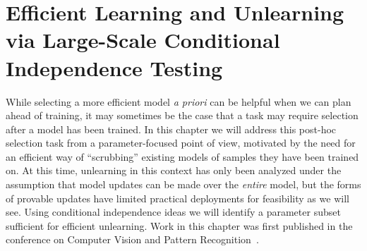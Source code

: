 \chapter{Efficient Learning and Unlearning via Large-Scale Conditional Independence Testing} \label{chap:lcodec} 

While selecting a more efficient model \textit{a priori}
can be helpful when we can plan ahead of training,
it may sometimes be the case
that a task may require selection
after a model has been trained.
In this chapter we will 
address this post-hoc selection task
from a parameter-focused point of view,
motivated by the need for an efficient way of 
``scrubbing'' existing models of samples
they have been trained on.
At this time, unlearning in this context has
only been analyzed under the assumption
that model updates can be made over the \textit{entire} model, but the forms of provable updates have limited
practical deployments for feasibility
as we will see.
Using conditional independence ideas
we will identify a parameter subset sufficient for
efficient unlearning.
Work in this chapter was first published
in the conference on Computer Vision and Pattern Recognition~\citep{lcodecunlearn}.









